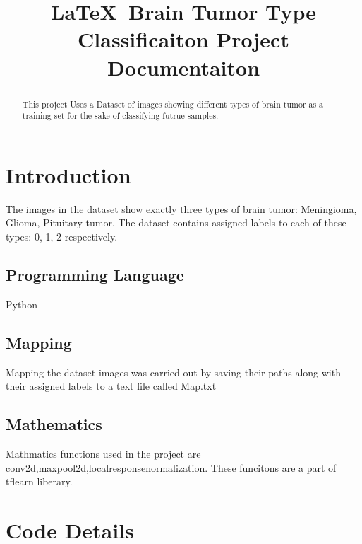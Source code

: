 \documentclass[10pt,twocolumn,letterpaper]{article}
\begin{document}
\title{\LaTeX\ Brain Tumor Type Classificaiton Project Documentaiton}


\maketitle

\begin{abstract}
This project Uses a Dataset of images\linebreak
showing different types of brain tumor as a training set for the sake of classifying futrue samples.
\end{abstract}

\section{Introduction}
The images in the dataset show exactly three types of brain tumor: Meningioma, Glioma, Pituitary tumor.\linebreak
The dataset contains assigned labels to each of these types: 0, 1, 2 respectively.

\subsection{Programming Language}
Python

\subsection{Mapping}
Mapping the dataset images was carried out by saving their paths along with their assigned labels to a text file called Map.txt

\subsection{Mathematics}

Mathmatics functions used in the project are conv2d,maxpool2d,localresponsenormalization.\linebreak
These funcitons are a part of tflearn liberary.

\section{Code Details}
\end{document}
